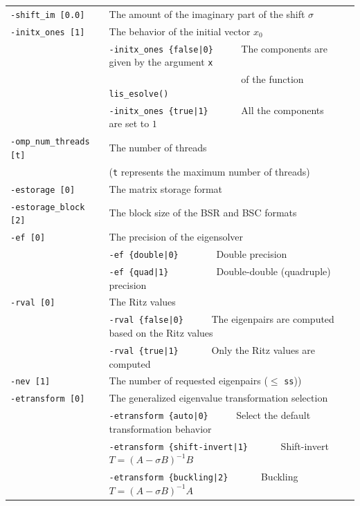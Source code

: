 \documentclass[a4paper]{article}
\begin{document}
\begin{minipage}[t]{\textwidth}
\begin{center}
\begin{tabular}{l|ll}
\verb=-shift_im [0.0]= & The amount of the imaginary part of the shift $\sigma$ \\
\verb=-initx_ones [1]= & The behavior of the initial vector $x_{0}$  \\
                       & \verb=-initx_ones {false|0}     =  The components are given by the argument \verb=x= \\
                       & \verb=                          =  of the function \verb=lis_esolve()= \\
                       & \verb=-initx_ones {true|1}      =  All the components are set to $1$ \\
\verb=-omp_num_threads [t]= & The number of threads        \\ 
                            & (\verb=t= represents the maximum number of
 threads) \\
\verb=-estorage [0]=   & The matrix storage format \\
\verb=-estorage_block [2]=& The block size of the BSR and BSC formats\\ 
\verb=-ef [0]=         & The precision of the eigensolver\\
                       & \verb=-ef {double|0}       =  Double precision \\ 
                       & \verb=-ef {quad|1}         =  Double-double (quadruple) precision \\
\verb=-rval [0]=       & The Ritz values \\
                       & \verb=-rval {false|0}     =  The eigenpairs are computed based on the Ritz values \\
                       & \verb=-rval {true|1}      =  Only the Ritz values are computed \\
\verb=-nev [1]=        & The number of requested eigenpairs ($\le$ \verb=ss=)) \\
\verb=-etransform [0]=       & The generalized eigenvalue transformation selection \\
                       & \verb=-etransform {auto|0}     =  Select the default transformation behavior \\
                       & \verb=-etransform {shift-invert|1}      =  Shift-invert $T = (A - \sigma B)^{-1}B$ \\
                       & \verb=-etransform {buckling|2}      =  Buckling $T = (A - \sigma B)^{-1}A$ \\
\hline         
\end{tabular}
\end{center}
\end{minipage}
\end{document}
